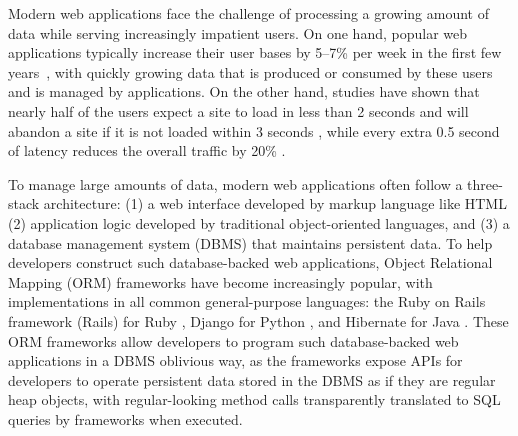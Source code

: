 Modern web applications face the challenge of processing a growing amount of data while serving increasingly impatient users. On one hand, popular web applications typically increase their user bases by 5--7\% per week in the first few years~\cite{startup}, with quickly growing data that is produced or consumed by these users and is managed by applications. 
On the other hand, studies have shown that nearly half of the users expect a site to load in less than 2 seconds and will abandon a site if it is not loaded within 3 seconds \cite{akamai2011}, while every extra 0.5 second of latency reduces the overall traffic by 20\% \cite{google.2006}.


To manage large amounts of data, modern web applications often follow a three-stack architecture: (1) a web interface developed by markup language like HTML (2) application logic developed by traditional object-oriented languages, and (3) a database management system (DBMS) that maintains persistent data.
To help developers %
construct such database-backed web applications, Object Relational Mapping (ORM) frameworks have become increasingly popular, with implementations in all common general-purpose languages: 
the Ruby on Rails framework (Rails) for Ruby \cite{ror}, Django for Python \cite{django}, and Hibernate for Java \cite{hibernate}. These ORM frameworks allow developers to program such database-backed web applications in a DBMS oblivious way, as the frameworks expose APIs for developers to operate persistent data stored in the DBMS as if they are regular heap objects, with regular-looking method calls transparently translated to SQL queries by frameworks when executed.

